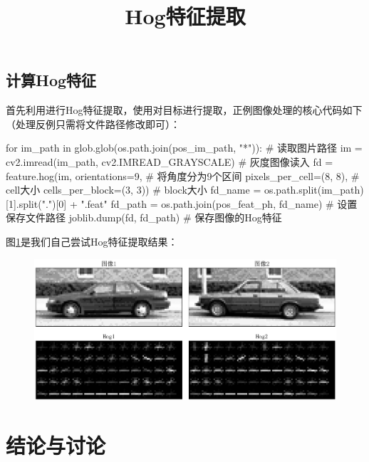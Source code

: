 \documentclass[12pt, a4paper, oneside]{ctexart}
\numberwithin{equation}{section}  %
\begin{document}
\subsection{计算Hog特征}
首先利用进行Hog特征提取，使用对目标进行提取，正例图像处理的核心代码如下（处理反例只需将文件路径修改即可）：
\begin{pythoncode}
for im_path in glob.glob(os.path.join(pos_im_path, "*")):  # 读取图片路径
    im = cv2.imread(im_path, cv2.IMREAD_GRAYSCALE)  # 灰度图像读入
    fd = feature.hog(im, orientations=9,  # 将角度分为9个区间
                      pixels_per_cell=(8, 8),  # cell大小
                      cells_per_block=(3, 3))  # block大小
    fd_name = os.path.split(im_path)[1].split(".")[0] + ".feat"
    fd_path = os.path.join(pos_feat_ph, fd_name)  # 设置保存文件路径
    joblib.dump(fd, fd_path)  # 保存图像的Hog特征
\end{pythoncode}

图\ref{fig-hog}是我们自己尝试Hog特征提取结果：
\begin{figure}[htbp]
  \hspace*{-1.2cm}
  \centering
  \includegraphics[scale=0.6]{hog特征提取.png}
  \title{Hog特征提取}
  \label{fig-hog}
\end{figure}
\section{结论与讨论}
\end{document}
